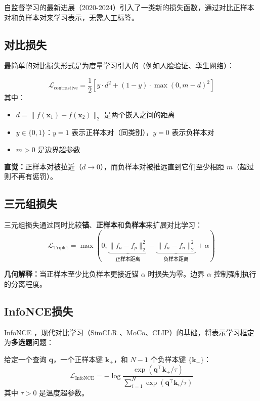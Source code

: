 自监督学习的最新进展（2020-2024）引入了一类新的损失函数，通过对比正样本对和负样本对来学习表示，无需人工标签。

\subsection{对比损失}

最简单的对比损失形式是为度量学习引入的（例如人脸验证、孪生网络）：

\begin{equation}
\mathcal{L}_{\text{contrastive}} = \frac{1}{2}\left[y \cdot d^2 + (1 - y) \cdot \max(0, m - d)^2\right]
\end{equation}
其中：
\begin{itemize}
    \item $d = \|f(\mathbf{x}_1) - f(\mathbf{x}_2)\|_2$ 是两个嵌入之间的距离
    \item $y \in \{0, 1\}$：$y = 1$ 表示正样本对（同类别），$y = 0$ 表示负样本对
    \item $m > 0$ 是边界超参数
\end{itemize}

\textbf{直觉：}正样本对被拉近（$d \to 0$），而负样本对被推远直到它们至少相距 $m$（超过则不再有惩罚）。

\subsection{三元组损失}

三元组损失通过同时比较\textbf{锚}、\textbf{正样本}和\textbf{负样本}来扩展对比学习：
\begin{equation}
\mathcal{L}_{\text{Triplet}} = \max\left(0, \underbrace{\|f_a - f_p\|_2^2}_{\text{正样本距离}} - \underbrace{\|f_a - f_n\|_2^2}_{\text{负样本距离}} + \alpha\right)
\end{equation}

\textbf{几何解释：}当正样本至少比负样本更接近锚 $\alpha$ 时损失为零。边界 $\alpha$ 控制强制执行的分离程度。

\subsection{InfoNCE损失}

InfoNCE \cite{oord2018representation}，现代对比学习（SimCLR \cite{chen2020simple}、MoCo、CLIP）的基础，将表示学习框定为\textbf{多选题}问题：

\begin{definition}[InfoNCE损失]
给定一个查询 $\mathbf{q}$，一个正样本键 $\mathbf{k}_+$，和 $N-1$ 个负样本键 $\{\mathbf{k}_-\}$：
\begin{equation}
\mathcal{L}_{\text{InfoNCE}} = -\log \frac{\exp(\mathbf{q}^\top \mathbf{k}_+ / \tau)}{\sum_{i=1}^{N} \exp(\mathbf{q}^\top \mathbf{k}_i / \tau)}
\end{equation}
其中 $\tau > 0$ 是温度超参数。
\end{definition}

